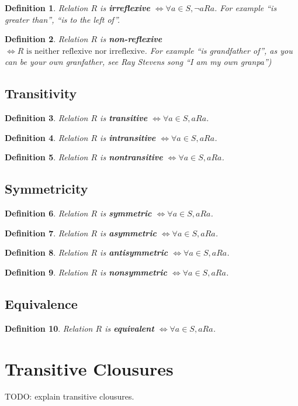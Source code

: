 \documentclass[11pt]{article}
\theoremstyle{plain}
\newtheorem{defn}{Definition}
\theoremstyle{definition}
\begin{document}
\begin{defn}
  Relation $R$ is \textbf{irreflexive} $\iff \forall a \in S, \neg aRa$.
  For example ``is greater than'', ``is to the left of''.
\end{defn}

\begin{defn}
  Relation $R$ is \textbf{non-reflexive} $\iff R \text{ is neither reflexive nor irreflexive}$.
  For example ``is grandfather of'', as you can be your own granfather,
  see Ray Stevens song ``I am my own granpa'')
\end{defn}

\subsection{Transitivity}

\begin{defn}
  Relation $R$ is \textbf{transitive} $\iff \forall a \in S, aRa$.
\end{defn}

\begin{defn}
  Relation $R$ is \textbf{intransitive} $\iff \forall a \in S, aRa$.
\end{defn}

\begin{defn}
  Relation $R$ is \textbf{nontransitive} $\iff \forall a \in S, aRa$.
\end{defn}


\subsection{Symmetricity}

\begin{defn}
  Relation $R$ is \textbf{symmetric} $\iff \forall a \in S, aRa$.
\end{defn}

\begin{defn}
  Relation $R$ is \textbf{asymmetric} $\iff \forall a \in S, aRa$.
\end{defn}

\begin{defn}
  Relation $R$ is \textbf{antisymmetric} $\iff \forall a \in S, aRa$.
\end{defn}

\begin{defn}
  Relation $R$ is \textbf{nonsymmetric} $\iff \forall a \in S, aRa$.
\end{defn}

\subsection{Equivalence}

\begin{defn}
  Relation $R$ is \textbf{equivalent} $\iff \forall a \in S, aRa$.
\end{defn}


\section{Transitive Clousures}

TODO: explain transitive clousures.
\end{document}
